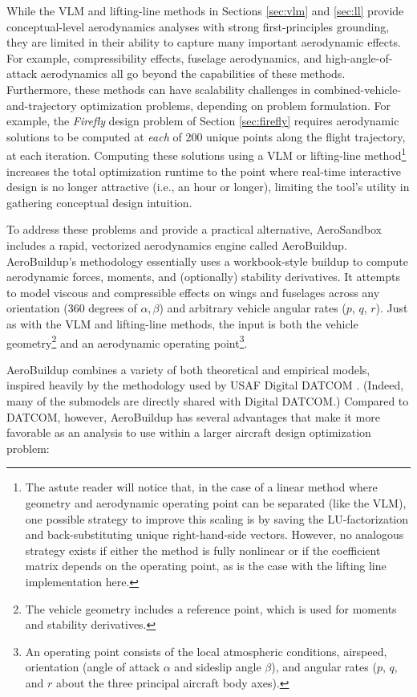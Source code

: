 While the VLM and lifting-line methods in Sections \ref{sec:vlm} and \ref{sec:ll} provide conceptual-level aerodynamics analyses with strong first-principles grounding, they are limited in their ability to capture many important aerodynamic effects. For example, compressibility effects, fuselage aerodynamics, and high-angle-of-attack aerodynamics all go beyond the capabilities of these methods. Furthermore, these methods can have scalability challenges in combined-vehicle-and-trajectory optimization problems, depending on problem formulation. For example, the \emph{Firefly} design problem of Section \ref{sec:firefly} requires aerodynamic solutions to be computed at \emph{each} of 200 unique points along the flight trajectory, at each iteration. Computing these solutions using a VLM or lifting-line method\footnote{The astute reader will notice that, in the case of a linear method where geometry and aerodynamic operating point can be separated (like the VLM), one possible strategy to improve this scaling is by saving the LU-factorization and back-substituting unique right-hand-side vectors. However, no analogous strategy exists if either the method is fully nonlinear or if the coefficient matrix depends on the operating point, as is the case with the lifting line implementation here.} increases the total optimization runtime to the point where real-time interactive design is no longer attractive (i.e., an hour or longer), limiting the tool's utility in gathering conceptual design intuition.

To address these problems and provide a practical alternative, AeroSandbox includes a rapid, vectorized aerodynamics engine called AeroBuildup. AeroBuildup's methodology essentially uses a workbook-style buildup to compute aerodynamic forces, moments, and (optionally) stability derivatives. It attempts to model viscous and compressible effects on wings and fuselages across any orientation (360 degrees of $\alpha, \beta$) and arbitrary vehicle angular rates ($p$, $q$, $r$). Just as with the VLM and lifting-line methods, the input is both the vehicle geometry\footnote{The vehicle geometry includes a reference point, which is used for moments and stability derivatives.} and an aerodynamic operating point\footnote{An operating point consists of the local atmospheric conditions, airspeed, orientation (angle of attack $\alpha$ and sideslip angle $\beta$), and angular rates ($p$, $q$, and $r$ about the three principal aircraft body axes).}.

AeroBuildup combines a variety of both theoretical and empirical models, inspired heavily by the methodology used by USAF Digital DATCOM \cite{datcom}. (Indeed, many of the submodels are directly shared with Digital DATCOM.) Compared to DATCOM, however, AeroBuildup has several advantages that make it more favorable as an analysis to use within a larger aircraft design optimization problem:


